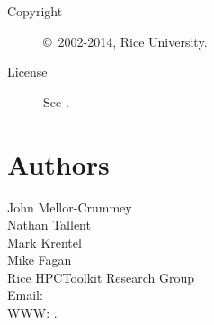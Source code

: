 \documentclass[english]{article}
\begin{document}
\begin{description}
\item[Copyright] \copyright\ 2002-2014, Rice University.
\item[License] See .
\end{description}

\section{Authors}

\noindent
John Mellor-Crummey \\
Nathan Tallent \\
Mark Krentel \\
Mike Fagan \\
Rice HPCToolkit Research Group \\
Email:  \\
WWW: .

\LatexManEnd
\end{document}
